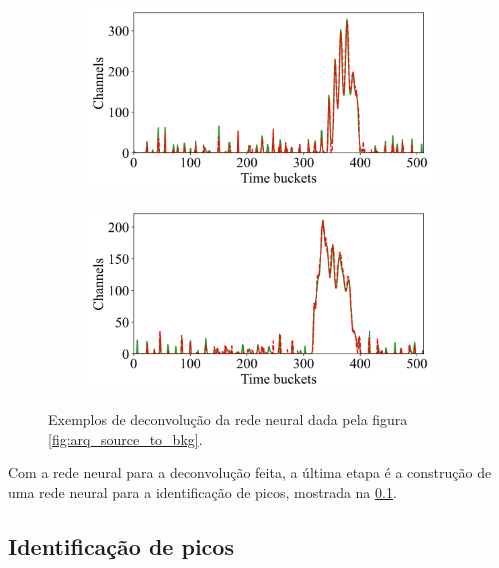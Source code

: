 \documentclass[a4paper,12pt,oneside]{book}
\begin{document}
\begin{figure}[H]
\begin{subfigure}[b]{0.465\textwidth}
        \caption{}
        \label{subfig:std_ex2}
    \end{subfigure}
    \begin{subfigure}[b]{0.49\textwidth}
        \centering
        \includegraphics[scale=0.425]{figs/swbtd_3.png}
        \caption{}
        \label{subfig:std_ex3}
    \end{subfigure}%
    \hfill
    \begin{subfigure}[b]{0.465\textwidth}
        \centering
        \includegraphics[scale=0.425]{figs/swbtd_4.png}
        \caption{}
        \label{subfig:std_ex4}
    \end{subfigure}
\caption{Exemplos de deconvolução da rede neural dada pela figura \ref{fig:arq_source_to_bkg}.}
\label{fig:std_examples}
\end{figure}

\par Com a rede neural para a deconvolução feita, a última etapa é a construção de uma rede neural para a identificação de picos, mostrada na \ref{subsec:pulso_ml_peaks}.

\subsection{Identificação de picos}\label{subsec:pulso_ml_peaks}
\end{document}
